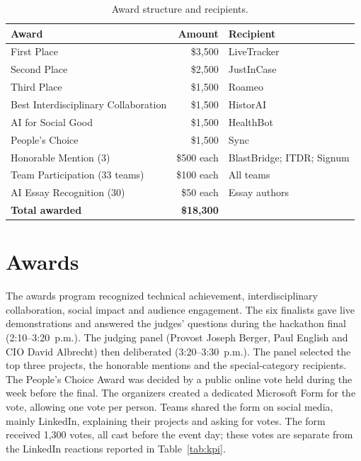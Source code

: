 \documentclass[sigconf,nonacm]{acmart}
\begin{document}


\begin{table}[t]
  \caption{Award structure and recipients.}
  \label{tab:awards}
  \small
  \begin{tabularx}{\columnwidth}{@{}Xrp{2.1cm}@{}}
    \toprule
    \textbf{Award} & \textbf{Amount} & \textbf{Recipient} \\
    \midrule
    First Place & \$3,500 & LiveTracker \\
    Second Place & \$2,500 & JustInCase \\
    Third Place & \$1,500 & Roameo \\
    Best Interdisciplinary Collaboration & \$1,500 & HistorAI \\
    AI for Social Good & \$1,500 & HealthBot \\
    People's Choice & \$1,500 & Sync \\
    Honorable Mention (3) & \$500 each & BlastBridge; ITDR; Signum \\
    Team Participation (33 teams) & \$100 each & All teams \\
    AI Essay Recognition (30) & \$50 each & Essay authors \\
    \midrule
    \textbf{Total awarded} & \textbf{\$18,300} & \\
    \bottomrule
  \end{tabularx}
\end{table}

\section{Awards}
The awards program recognized technical achievement, interdisciplinary collaboration, social impact and audience engagement. The six finalists gave live demonstrations and answered the judges' questions during the hackathon final (2:10--3:20~p.m.). The judging panel (Provost Joseph Berger, Paul English and CIO David Albrecht) then deliberated (3:20--3:30~p.m.). The panel selected the top three projects, the honorable mentions and the special-category recipients. The People's Choice Award was decided by a public online vote held during the week before the final. The organizers created a dedicated Microsoft Form for the vote, allowing one vote per person. Teams shared the form on social media, mainly LinkedIn, explaining their projects and asking for votes. The form received 1,300 votes, all cast before the event day; these votes are separate from the LinkedIn reactions reported in Table~\ref{tab:kpi}.
\end{document}
